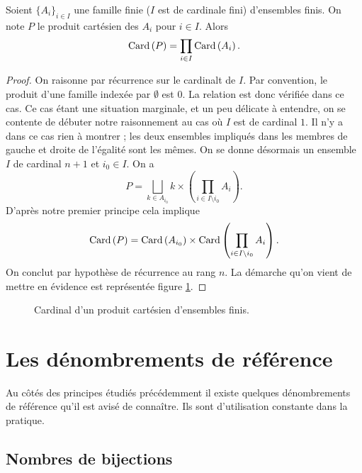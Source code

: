 \documentclass[12pt, a4paper]{article}
\begin{document}
\begin{prop}
  Soient $\{A_i\}_{i \in I}$ une famille finie ($I$ est de cardinale
  fini) d'ensembles finis. On note $P$ le produit cartésien des $A_i$
  pour $i \in I$. Alors
  \[
    \mathrm{Card}\left(P\right) = \prod_{i \in I} \mathrm{Card}\left(A_i\right).
  \]
\end{prop}
\begin{proof}
  On raisonne par récurrence sur le cardinalt de $I$. Par convention,
  le produit d'une famille indexée par $\emptyset$ est $0$. La
  relation est donc vérifiée dans ce cas. Ce cas étant une situation
  marginale, et un peu délicate à entendre, on se contente de débuter
  notre raisonnement au cas où $I$ est de cardinal $1$. Il n'y a dans
  ce cas rien à montrer ; les deux ensembles impliqués dans les
  membres de gauche et droite de l'égalité sont les mêmes. On se donne
  désormais un ensemble $I$ de cardinal $n+1$ et $i_0 \in I$. On a
  \[
    P = \bigsqcup_{k \in A_{i_0}} {k}\times\left(\prod_{i \in
        I\setminus i_0} A_i\right).
  \]
  D'après notre premier principe cela implique
  \[
    \mathrm{Card}\left(P\right) = \mathrm{Card}\left(A_{i_0}\right) \times \mathrm{Card}\left(\prod_{i \in I\setminus i_0} A_i\right).
  \]
  On conclut par hypothèse de récurrence au rang $n$. La démarche
  qu'on vient de mettre en évidence est représentée figure
  \ref{fig:product}.
\end{proof}
\begin{figure}
  \centering
  \caption{Cardinal d'un produit cartésien d'ensembles finis.}
  \label{fig:product}
\end{figure}
\section{Les dénombrements de référence}

Au côtés des principes étudiés précédemment il existe quelques
dénombrements de référence qu'il est avisé de connaître. Ils sont
d'utilisation constante dans la pratique.

\subsection{Nombres de bijections}
\end{document}
